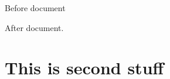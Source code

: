 \documentclass[11pt,letterpaper,notitlepage,twoside,openright]{report}
\begin{document}
Before document



%
%
%
%

After document.

\chapter{This is second stuff}
\end{document}
